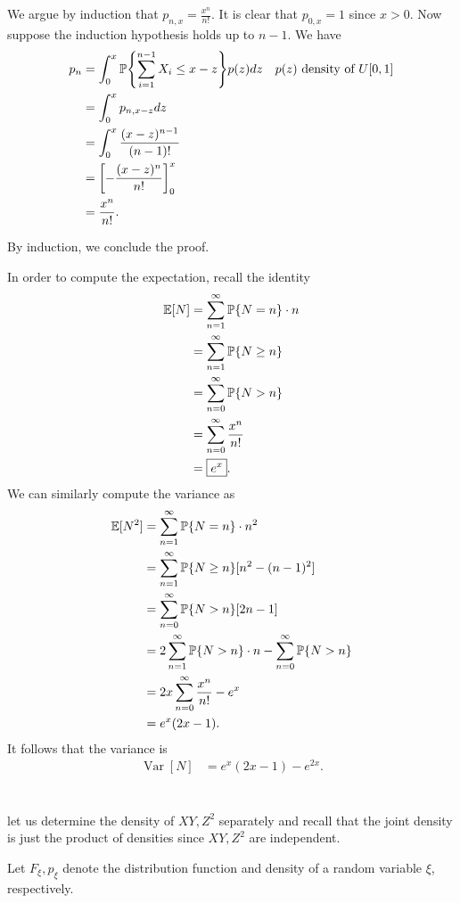 \documentclass[10pt]{article}
\DeclarePairedDelimiter{\set}{\lbrace}{\rbrace}
\DeclareMathOperator{\Var}{Var}
\newcommand{\E}{\mathbb{E}}
\renewcommand{\P}{\mathbb{P}}
\begin{document}
We argue by induction that $p_{n, x} = \frac{x^n}{n!}$.
It is clear that $p_{0, x} = 1$ since $x > 0$.
Now suppose the induction hypothesis holds up to $n-1$.
We have
\begin{align*}
  p_n
  &= \int_0^x \P\set*{\sum_{i=1}^{n-1} X_i\leq x-z} p(z) dz &&\text{$p(z)$ density of $U[0, 1]$} \\
  &= \int_0^x p_{n, x-z} dz \\
  &= \int_0^x \frac{(x-z)^{n-1}}{(n-1)!} \\
  &= \left[ -\frac{(x-z)^n}{n!} \right]_0^x \\
  &= \frac{x^n}{n!}.
\end{align*}

By induction,
we conclude the proof.

In order to compute the expectation,
recall the identity
\begin{align*}
  \E[N]
  &= \sum_{n=1}^\infty \P\set{N = n}\cdot n \\
  &= \sum_{n=1}^\infty \P\set{N\geq n} \\
  &= \sum_{n=0}^\infty \P\set{N > n} \\
  &= \sum_{n=0}^\infty \frac{x^n}{n!} \\
  &= \boxed{e^x}.
\end{align*}
We can similarly compute the variance as
\begin{align*}
  \E[N^2]
  &= \sum_{n=1}^\infty \P\set{N = n}\cdot n^2 \\
  &= \sum_{n=1}^\infty \P\set{N\geq n} [n^2 - (n-1)^2] \\
  &= \sum_{n=0}^\infty \P\set{N > n} [2n-1] \\
  &= 2 \sum_{n=1}^\infty \P\set{N > n}\cdot n - \sum_{n=0}^\infty \P\set{N>n} \\
  &= 2x \sum_{n=0}^\infty \frac{x^n}{n!} - e^x \\
  &= e^x(2x-1).
\end{align*}
It follows that the variance is
\begin{align*}
  \Var[N]
  &= \boxed{e^x(2x-1) - e^{2x}}.
\end{align*}

\clearpage
\section{}
let us determine the density of $XY, Z^2$ separately
and recall that the joint density is just the product of densities
since $XY, Z^2$ are independent.

Let $F_{\xi}, p_{\xi}$ denote the distribution function
and density of a random variable $\xi$,
respectively.
\end{document}
